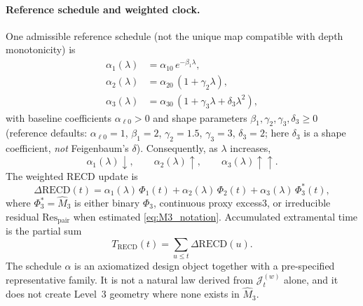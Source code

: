 \documentclass[11pt,a4paper]{article}
\begin{document}
\paragraph{Reference schedule and weighted clock.}
One admissible reference schedule (not the unique map compatible with
depth monotonicity) is
\begin{equation}
\label{eq:alphas}
\begin{aligned}
\alpha_1(\lambda)
&=\alpha_{10}\,e^{-\beta_1\lambda},\\
\alpha_2(\lambda)
&=\alpha_{20}\,(1+\gamma_2\lambda),\\
\alpha_3(\lambda)
&=\alpha_{30}\,(1+\gamma_3\lambda+\delta_3\lambda^2),
\end{aligned}
\end{equation}
with baseline coefficients $\alpha_{\ell 0}>0$ and shape parameters
$\beta_1,\gamma_2,\gamma_3,\delta_3\geq 0$ (reference defaults:
$\alpha_{\ell 0}=1$, $\beta_1=2$, $\gamma_2=1.5$, $\gamma_3=3$,
$\delta_3=2$; here $\delta_3$ is a shape coefficient, \emph{not}
Feigenbaum's $\delta$). Consequently, as $\lambda$ increases,
\begin{equation}
\alpha_1(\lambda)\downarrow,\qquad
\alpha_2(\lambda)\uparrow,\qquad
\alpha_3(\lambda)\uparrow\!\uparrow.
\end{equation}
The weighted RECD update is
\begin{equation}
\label{eq:drecd}
\Delta\mathrm{RECD}(t)
=\alpha_1(\lambda)\,\Phi_1(t)
+\alpha_2(\lambda)\,\Phi_2(t)
+\alpha_3(\lambda)\,\Phi_3^{\ast}(t),
\end{equation}
where $\Phi_3^{\ast}=\widehat{M}_3$ is either binary $\Phi_3$, continuous
proxy excess3, or irreducible residual $\mathrm{Res}_{\mathrm{pair}}$
when estimated \eqref{eq:M3_notation}. Accumulated extramental time is
the partial sum
\begin{equation}
T_{\mathrm{RECD}}(t)
=\sum_{u\leq t}\Delta\mathrm{RECD}(u).
\end{equation}
The schedule $\alpha$ is an axiomatized design object together with a
pre-specified representative family. It is not a natural law derived
from $\mathcal{J}_t^{(w)}$ alone, and it does not create Level~3
geometry where none exists in $\widehat{M}_3$.
\end{document}
